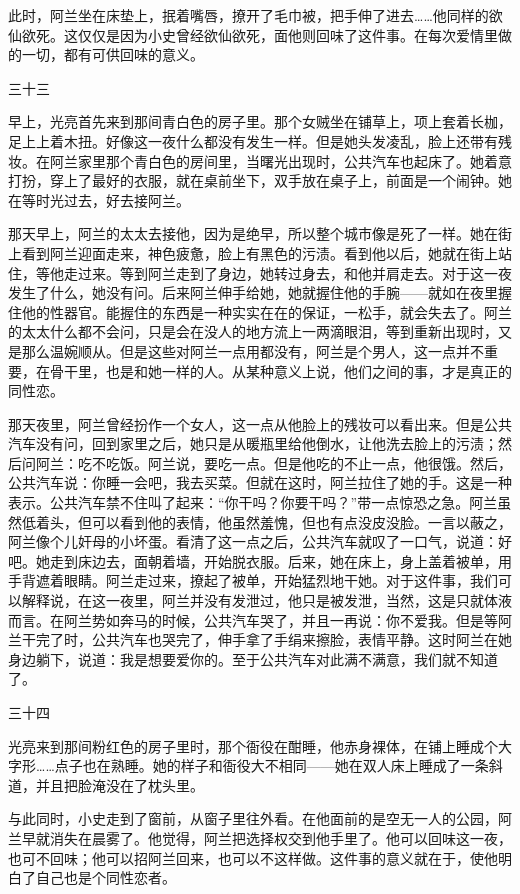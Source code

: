 此时，阿兰坐在床垫上，抿着嘴唇，撩开了毛巾被，把手伸了进去……他同样的欲仙欲死。这仅仅是因为小史曾经欲仙欲死，面他则回味了这件事。在每次爱情里做的一切，都有可供回味的意义。 

三十三 

早上，光亮首先来到那间青白色的房子里。那个女贼坐在铺草上，项上套着长枷，足上上着木扭。好像这一夜什么都没有发生一样。但是她头发凌乱，脸上还带有残妆。在阿兰家里那个青白色的房间里，当曙光出现时，公共汽车也起床了。她着意打扮，穿上了最好的衣服，就在桌前坐下，双手放在桌子上，前面是一个闹钟。她在等时光过去，好去接阿兰。 

那天早上，阿兰的太太去接他，因为是绝早，所以整个城市像是死了一样。她在街上看到阿兰迎面走来，神色疲惫，脸上有黑色的污渍。看到他以后，她就在街上站住，等他走过来。等到阿兰走到了身边，她转过身去，和他并肩走去。对于这一夜发生了什么，她没有问。后来阿兰伸手给她，她就握住他的手腕——就如在夜里握住他的性器官。能握住的东西是一种实实在在的保证，一松手，就会失去了。阿兰的太太什么都不会问，只是会在没人的地方流上一两滴眼泪，等到重新出现时，又是那么温婉顺从。但是这些对阿兰一点用都没有，阿兰是个男人，这一点并不重要，在骨干里，也是和她一样的人。从某种意义上说，他们之间的事，才是真正的同性恋。 

那天夜里，阿兰曾经扮作一个女人，这一点从他脸上的残妆可以看出来。但是公共汽车没有问，回到家里之后，她只是从暖瓶里给他倒水，让他洗去脸上的污渍；然后问阿兰：吃不吃饭。阿兰说，要吃一点。但是他吃的不止一点，他很饿。然后，公共汽车说：你睡一会吧，我去买菜。但就在这时，阿兰拉住了她的手。这是一种表示。公共汽车禁不住叫了起来：“你干吗？你要干吗？”带一点惊恐之急。阿兰虽然低着头，但可以看到他的表情，他虽然羞愧，但也有点没皮没脸。一言以蔽之，阿兰像个儿奸母的小坏蛋。看清了这一点之后，公共汽车就叹了一口气，说道：好吧。她走到床边去，面朝着墙，开始脱衣服。后来，她在床上，身上盖着被单，用手背遮着眼睛。阿兰走过来，撩起了被单，开始猛烈地干她。对于这件事，我们可以解释说，在这一夜里，阿兰并没有发泄过，他只是被发泄，当然，这是只就体液而言。在阿兰势如奔马的时候，公共汽车哭了，并且一再说：你不爱我。但是等阿兰干完了时，公共汽车也哭完了，伸手拿了手绢来擦脸，表情平静。这时阿兰在她身边躺下，说道：我是想要爱你的。至于公共汽车对此满不满意，我们就不知道了。 

三十四 

光亮来到那间粉红色的房子里时，那个衙役在酣睡，他赤身裸体，在铺上睡成个大字形……点子也在熟睡。她的样子和衙役大不相同——她在双人床上睡成了一条斜道，并且把脸淹没在了枕头里。 

与此同时，小史走到了窗前，从窗子里往外看。在他面前的是空无一人的公园，阿兰早就消失在晨雾了。他觉得，阿兰把选择权交到他手里了。他可以回味这一夜，也可不回味；他可以招阿兰回来，也可以不这样做。这件事的意义就在于，使他明白了自己也是个同性恋者。 

